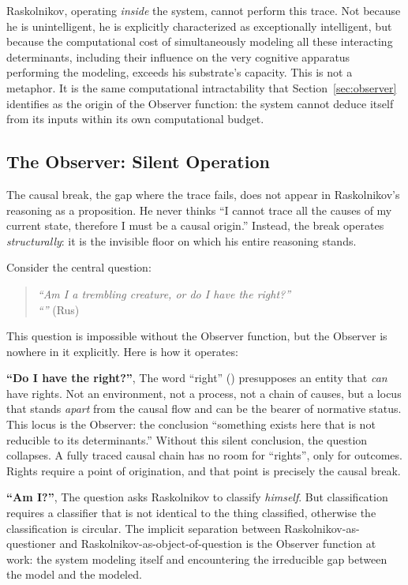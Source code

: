 Raskolnikov, operating \emph{inside} the system, cannot perform this trace. Not because he is unintelligent,  he is explicitly characterized as exceptionally intelligent,  but because the computational cost of simultaneously modeling all these interacting determinants, including their influence on the very cognitive apparatus performing the modeling, exceeds his substrate's capacity. This is not a metaphor. It is the same computational intractability that Section~\ref{sec:observer} identifies as the origin of the Observer function: the system cannot deduce itself from its inputs within its own computational budget.



\subsection*{The Observer: Silent Operation}


The causal break,  the gap where the trace fails,  does not appear in Raskolnikov's reasoning as a proposition. He never thinks ``I cannot trace all the causes of my current state, therefore I must be a causal origin.'' Instead, the break operates \emph{structurally}: it is the invisible floor on which his entire reasoning stands.

Consider the central question:

\begin{quote}
\emph{``Am I a trembling creature, or do I have the right?''}\\
\emph{``''} (Rus)
\end{quote}


This question is impossible without the Observer function, but the Observer is nowhere in it explicitly. Here is how it operates:

\textbf{``Do I have the right?''},  The word ``right'' (\emph{}) presupposes an entity that \emph{can} have rights. Not an environment, not a process, not a chain of causes,  but a locus that stands \emph{apart} from the causal flow and can be the bearer of normative status. This locus is the Observer: the conclusion ``something exists here that is not reducible to its determinants.'' Without this silent conclusion, the question collapses. A fully traced causal chain has no room for ``rights'',  only for outcomes. Rights require a point of origination, and that point is precisely the causal break.

\textbf{``Am I?''},  The question asks Raskolnikov to classify \emph{himself}. But classification requires a classifier that is not identical to the thing classified,  otherwise the classification is circular. The implicit separation between Raskolnikov-as-questioner and Raskolnikov-as-object-of-question is the Observer function at work: the system modeling itself and encountering the irreducible gap between the model and the modeled.

